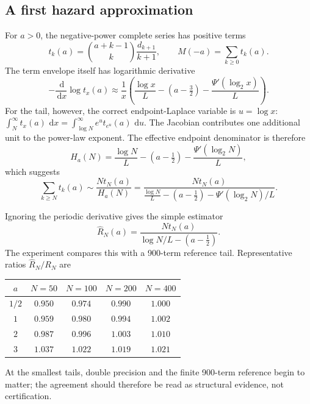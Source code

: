\documentclass[11pt,oneside]{article}
\theoremstyle{definition}
\theoremstyle{remark}
\newcommand{\dd}{\,\mathrm d}
\newcommand{\1}{\mathbf 1}
\begin{document}
\subsection{A first hazard approximation}

For $a>0$, the negative-power complete series has positive terms
\begin{equation}
 t_k(a)=\binom{a+k-1}{k}\frac{d_{k+1}}{k+1},
 \qquad M(-a)=\sum_{k\ge0}t_k(a).                             \label{p3:eq:negative-terms}
\end{equation}
The term envelope itself has logarithmic derivative
\begin{equation}
 -\frac{\dd}{\dd x}\log t_x(a)
 \approx\frac1x\left(\frac{\log x}{L}-(a-\tfrac32)
 -\frac{\Psi'(\log_2x)}{L}\right).                          \label{p3:eq:term-hazard}
\end{equation}
For the tail, however, the correct endpoint-Laplace variable is $u=\log x$:
\(
\int_N^\infty t_x(a)\,\dd x
 =\int_{\log N}^\infty e^u t_{e^u}(a)\,\dd u.
\)
The Jacobian contributes one additional unit to the power-law exponent.  The effective
endpoint denominator is therefore
\begin{equation}
 H_a(N)=\frac{\log N}{L}-(a-\tfrac12)
 -\frac{\Psi'(\log_2N)}{L},                                  \label{p3:eq:hazard}
\end{equation}
which suggests
\begin{equation}
 \sum_{k\ge N}t_k(a)
 \sim\frac{Nt_N(a)}{H_a(N)}
 =\frac{Nt_N(a)}{\frac{\log N}{L}-(a-\tfrac12)
 -\Psi'(\log_2N)/L}.                                        \label{p3:eq:tail-conjectural}
\end{equation}

Ignoring the periodic derivative gives the simple estimator
\begin{equation}
 \widehat R_N(a)=
 \frac{Nt_N(a)}{\log N/L-(a-\tfrac12)}.                      \label{p3:eq:tail-simple}
\end{equation}
The experiment compares this with a 900-term reference tail.  Representative ratios
$\widehat R_N/R_N$ are
\begin{center}
\begin{tabular}{@{}ccccc@{}}
\toprule
$a$ & $N=50$ & $N=100$ & $N=200$ & $N=400$\\
\midrule
$1/2$ & $0.950$ & $0.974$ & $0.990$ & $1.000$\\
$1$   & $0.959$ & $0.980$ & $0.994$ & $1.002$\\
$2$   & $0.987$ & $0.996$ & $1.003$ & $1.010$\\
$3$   & $1.037$ & $1.022$ & $1.019$ & $1.021$\\
\bottomrule
\end{tabular}
\end{center}
At the smallest tails, double precision and the finite 900-term reference begin to matter;
the agreement should therefore be read as structural evidence, not certification.
\end{document}
